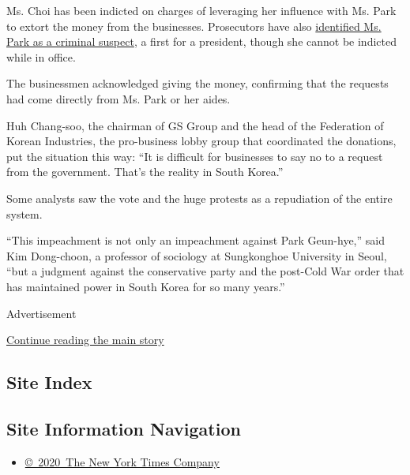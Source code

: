 Ms. Choi has been indicted on charges of leveraging her influence with
Ms. Park to extort the money from the businesses. Prosecutors have also
\href{http://www.nytimes.com/2016/11/20/world/asia/park-geun-hye-south-korea-extortion-accomplice-prosecutors.html}{identified
Ms. Park as a criminal suspect}, a first for a president, though she
cannot be indicted while in office.

The businessmen acknowledged giving the money, confirming that the
requests had come directly from Ms. Park or her aides.

Huh Chang-soo, the chairman of GS Group and the head of the Federation
of Korean Industries, the pro-business lobby group that coordinated the
donations, put the situation this way: ``It is difficult for businesses
to say no to a request from the government. That's the reality in South
Korea.''

Some analysts saw the vote and the huge protests as a repudiation of the
entire system.

``This impeachment is not only an impeachment against Park Geun-hye,''
said Kim Dong-choon, a professor of sociology at Sungkonghoe University
in Seoul, ``but a judgment against the conservative party and the
post-Cold War order that has maintained power in South Korea for so many
years.''

Advertisement

\protect\hyperlink{after-bottom}{Continue reading the main story}

\hypertarget{site-index}{%
\subsection{Site Index}\label{site-index}}

\hypertarget{site-information-navigation}{%
\subsection{Site Information
Navigation}\label{site-information-navigation}}

\begin{itemize}
\tightlist
\item
  \href{https://help.nytimes.com/hc/en-us/articles/115014792127-Copyright-notice}{©~2020~The
  New York Times Company}
\end{itemize}

